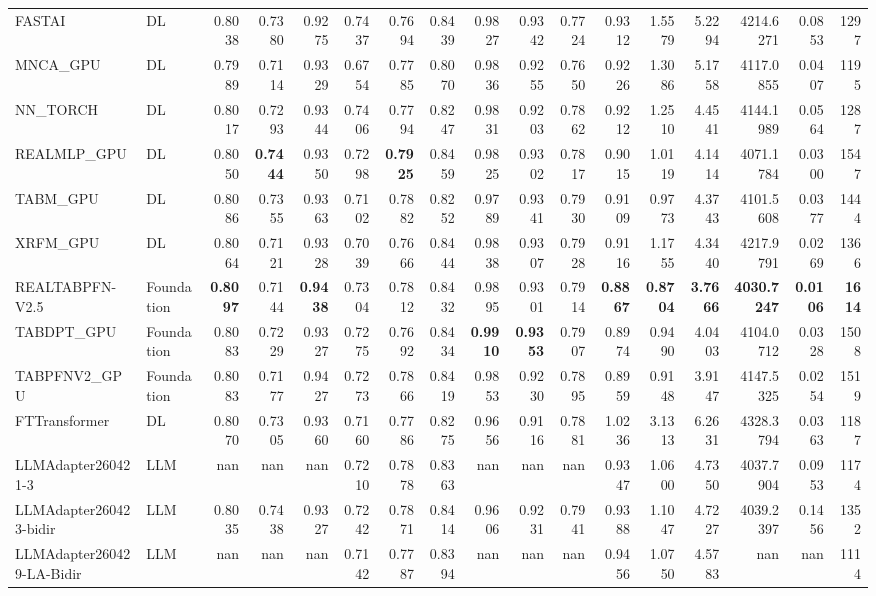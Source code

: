 \begin{table}[htbp]
{\begin{tabular}{ll|rrrrrrrrrrrrrr|r}
FASTAI & DL & 0.8038 & 0.7380 & 0.9275 & 0.7437 & 0.7694 & 0.8439 & 0.9827 & 0.9342 & 0.7724 & 0.9312 & 1.5579 & 5.2294 & 4214.6271 & 0.0853 & 1297 \\
MNCA\_GPU & DL & 0.7989 & 0.7114 & 0.9329 & 0.6754 & 0.7785 & 0.8070 & 0.9836 & 0.9255 & 0.7650 & 0.9226 & 1.3086 & 5.1758 & 4117.0855 & 0.0407 & 1195 \\
NN\_TORCH & DL & 0.8017 & 0.7293 & 0.9344 & 0.7406 & 0.7794 & 0.8247 & 0.9831 & 0.9203 & 0.7862 & 0.9212 & 1.2510 & 4.4541 & 4144.1989 & 0.0564 & 1287 \\
REALMLP\_GPU & DL & 0.8050 & \textbf{0.7444} & 0.9350 & 0.7298 & \textbf{0.7925} & 0.8459 & 0.9825 & 0.9302 & 0.7817 & 0.9015 & 1.0119 & 4.1414 & 4071.1784 & 0.0300 & 1547 \\
TABM\_GPU & DL & 0.8086 & 0.7355 & 0.9363 & 0.7102 & 0.7882 & 0.8252 & 0.9789 & 0.9341 & 0.7930 & 0.9109 & 0.9773 & 4.3743 & 4101.5608 & 0.0377 & 1444 \\
XRFM\_GPU & DL & 0.8064 & 0.7121 & 0.9328 & 0.7039 & 0.7666 & 0.8444 & 0.9838 & 0.9307 & 0.7928 & 0.9116 & 1.1755 & 4.3440 & 4217.9791 & 0.0269 & 1366 \\
REALTABPFN-V2.5 & Foundation & \textbf{0.8097} & 0.7144 & \textbf{0.9438} & 0.7304 & 0.7812 & 0.8432 & 0.9895 & 0.9301 & 0.7914 & \textbf{0.8867} & \textbf{0.8704} & \textbf{3.7666} & \textbf{4030.7247} & \textbf{0.0106} & \textbf{1614} \\
TABDPT\_GPU & Foundation & 0.8083 & 0.7229 & 0.9327 & 0.7275 & 0.7692 & 0.8434 & \textbf{0.9910} & \textbf{0.9353} & 0.7907 & 0.8974 & 0.9490 & 4.0403 & 4104.0712 & 0.0328 & 1508 \\
TABPFNV2\_GPU & Foundation & 0.8083 & 0.7177 & 0.9427 & 0.7273 & 0.7866 & 0.8419 & 0.9853 & 0.9230 & 0.7895 & 0.8959 & 0.9148 & 3.9147 & 4147.5325 & 0.0254 & 1519 \\
\midrule
FTTransformer & DL & 0.8070 & 0.7305 & 0.9360 & 0.7160 & 0.7786 & 0.8275 & 0.9656 & 0.9116 & 0.7881 & 1.0236 & 3.1313 & 6.2631 & 4328.3794 & 0.0363 & 1187 \\
LLMAdapter260421-3 & LLM & nan & nan & nan & 0.7210 & 0.7878 & 0.8363 & nan & nan & nan & 0.9347 & 1.0600 & 4.7350 & 4037.7904 & 0.0953 & 1174 \\
LLMAdapter260423-bidir & LLM & 0.8035 & 0.7438 & 0.9327 & 0.7242 & 0.7871 & 0.8414 & 0.9606 & 0.9231 & 0.7941 & 0.9388 & 1.1047 & 4.7227 & 4039.2397 & 0.1456 & 1352 \\
LLMAdapter260429-LA-Bidir & LLM & nan & nan & nan & 0.7142 & 0.7787 & 0.8394 & nan & nan & nan & 0.9456 & 1.0750 & 4.5783 & nan & nan & 1114 \\

\end{tabular}}
\end{table}
